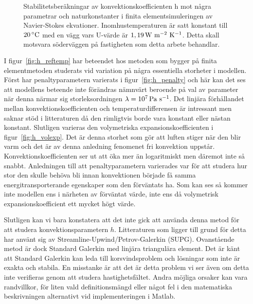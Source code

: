 \begin{figure}[hpbt]
\caption{\label{fig:konv_param}Stabilitets\-beräkningar av konvektions\-koefficienten h mot några
parametrar och natur\-konstanter i finita element\-simuleringen av Navier-Stokes ekvationer.
Inomhus\-temperaturen är satt konstant till $\unit[20]{^\circ C}$ med en vägg vars U-värde är
$\unit[1,19]{ W~m^{-2}~K^{-1}}$. Detta skall motsvara söder\-väggen på fastigheten som detta arbete behandlar.}

\end{figure}

I figur~\ref{fig:h_reftemp} har beteendet hos metoden som bygger på finita elementmetoden studerats vid variation på några essentiella storheter i modellen.
Först har penaltyparametern varierats i figur~\ref{fig:h_penalty} och här kan det ses att modellens beteende inte förändras nämnvärt
beroende på val av parameter när denna närmar sig storleksordningen $\lambda = \unit[10^7]{Pa~s^{-1}}$. Det linjära förhållandet mellan
konvektionskoefficienten och temperaturdifferensen är intressant men saknar stöd i litteraturen då den rimligtvis borde vara
konstant eller nästan konstant. Slutligen varieras den volymetriska expansionskoefficienten
i figur~\ref{fig:h_volexp}. Det är denna storhet
som gör att luften stiger när den blir varm och det är av denna anledning fenomenet fri konvektion uppstår. Konvektionskoefficienten
ser ut att öka mer än logaritmiskt men däremot inte så snabbt. Anledningen till att penaltyparametern varierades var för
att studera hur stor den skulle behöva bli innan konvektionen började få samma energitransporterande egenskaper
som den förväntats ha. Som kan ses så kommer inte modellen ens i närheten av förväntat värde, inte ens då volymetrisk expansionskoefficient ett mycket högt värde.

Slutligen kan vi bara konstatera att det inte gick att använda denna metod för att studera konvektionsparametern $h$. Litteraturen
som ligger till grund för detta har använt sig av Streamline-Upwind/Petrov-Galerkin (SUPG)\cite{heinrich88}\cite{roy05}. Ovanstående metod är dock
Standard Galerkin med linjära triangulära element. Det är känt att Standard Galerkin kan leda till korsvindsproblem och lösningar som inte är
exakta och stabila\cite{segal2011}.
En misstanke är att det är detta problem vi ser även om detta inte verifieras genom att studera hastighetsfältet. Andra
möjliga orsaker kan vara randvillkor, för liten vald definitionsmängd eller något fel i den matematiska beskrivningen alternativt
vid implementeringen i Matlab.
